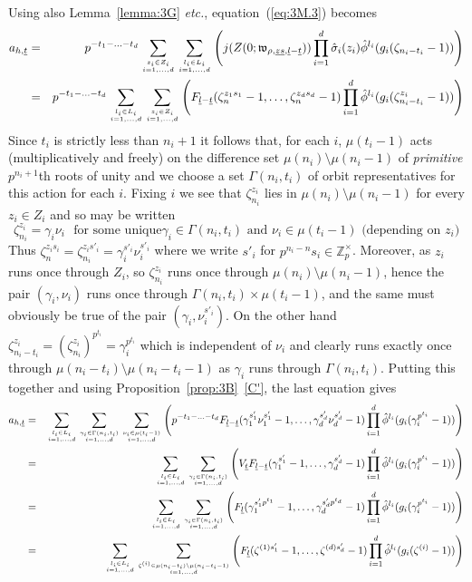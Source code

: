\documentclass[12pt]{article}
\newcounter{rem}[section]%
\newcommand{\bbZ}{\ensuremath{\mathbb{Z}}}
\newcommand{\etc}{\emph{etc.}}
\newcommand{\fw}{\ensuremath{\mathfrak{w}}}
\newcommand{\refeq}[1]{~(\ref{eq:#1})}
\newcommand{\rem}{\refstepcounter{rem}\noindent{\sc Remark \therem}}%
\renewcommand{\therem}{\thesection.\arabic{rem}}
\newcommand{\ul}{\ensuremath{{\underline{l}}}}
\newcommand{\us}{\ensuremath{{\underline{s}}}}
\newcommand{\ut}{\ensuremath{{\underline{t}}}}
\newcommand{\uz}{\ensuremath{{\underline{z}}}}
\begin{document}
Using also Lemma~\ref{lemma:3G} \etc, equation\refeq{3M.3} becomes
\begin{eqnarray*}
a_{h,\underline{t}}&=& p^{-t_1-\ldots-t_d}
\sum_{z_i\in Z_i\atop i=1,\ldots,d}
\sum_{l_i\in L_i\atop i=1,\ldots,d}
\left(
j(Z(0;\fw_{\rho,\uz\us,\ul-\ut}))\prod_{i=1}^d
\hat{\sigma}_i(z_i)\hat{\phi}^{l_i}
(g_i(\zeta_{n_i-t_i}-1))
\right)\\
&=& p^{-t_1-\ldots-t_d}
\sum_{l_i\in L_i\atop i=1,\ldots,d}
\sum_{z_i\in Z_i\atop i=1,\ldots,d}
\left(
F_{\ul-\ut}(\zeta_n^{z_1s_1}-1,\ldots,\zeta_n^{z_ds_d}-1)
\prod_{i=1}^d
\hat{\phi}^{l_i}
(g_i(\zeta_{n_i-t_i}^{z_i}-1))
\right)
\end{eqnarray*}
Since $t_i$ is strictly less than $n_i+1$ it follows that, for each $i$,
$\mu(t_i-1)$ acts (multiplicatively and freely) on the difference set
$\mu(n_i)\setminus\mu(n_i-1)$ of
\emph{primitive} $p^{n_i+1}$th roots of unity
and we choose a set $\Gamma(n_i,t_i)$ of orbit representatives
for this action for each $i$. Fixing $i$ we see that
$\zeta_{n_i}^{z_i}$ lies in $\mu(n_i)\setminus\mu(n_i-1)$
for every $z_i\in Z_i$ and so may be written
\[
\zeta_{n_i}^{z_i}=\gamma_i\nu_i\ \ \ \mbox{for some unique
$\gamma_i\in \Gamma(n_i,t_i)$ and $\nu_i\in\mu(t_i-1)$ (depending on $z_i$)}
\]
Thus $\zeta_n^{z_is_i}=\zeta_{n_i}^{z_is'_i}=
\gamma_i^{s'_i}\nu_i^{s'_i}$ where we write $s'_i$ for
$p^{n_i-n}s_i\in\bbZ_p^\times$.
Moreover, as $z_i$ runs once through $Z_i$, so
$\zeta_{n_i}^{z_i}$ runs once through  $\mu(n_i)\setminus\mu(n_i-1)$,
hence the pair
$(\gamma_i,\nu_i)$ runs once through $\Gamma(n_i,t_i)\times \mu(t_i-1)$,
and the same must obviously be true of the pair $(\gamma_i,\nu_i^{s'_i})$.
On the other hand $\zeta_{n_i-t_i}^{z_i}=
(\zeta_{n_i}^{z_i})^{p^{t_i}}=\gamma_i^{p^{t_i}}$
which is independent of $\nu_i$ and clearly runs exactly once through
$\mu(n_i-t_i)\setminus\mu(n_i-t_i-1)$
as $\gamma_i$ runs
through $\Gamma(n_i,t_i)$. Putting this together
and using Proposition~\ref{prop:3B}~\ref{C'},
the last equation gives
\begin{eqnarray*}
a_{h,\underline{t}}&=&\sum_{l_i\in L_i\atop i=1,\ldots,d}
\sum_{\gamma_i\in \Gamma(n_i,t_i)\atop i=1,\ldots,d}
\sum_{\nu_i\in\mu(t_i-1)\atop i=1,\ldots,d}
\left(
p^{-t_1-\ldots-t_d}
F_{\ul-\ut}(\gamma_1^{s'_1}\nu_1^{s'_1}-1,\ldots,
\gamma_d^{s'_d}\nu_d^{s'_d}-1)
\prod_{i=1}^d\hat{\phi}^{l_i}(g_i(\gamma_i^{p^{t_i}}-1))
\right)
\\
                   &=&
\sum_{l_i\in L_i\atop i=1,\ldots,d}
\sum_{\gamma_i\in \Gamma(n_i,t_i)\atop i=1,\ldots,d}
\left(
V_\ut
F_{\ul-\ut}(\gamma_1^{s'_1}-1,\ldots,
\gamma_d^{s'_d}-1)
\prod_{i=1}^d\hat{\phi}^{l_i}(g_i(\gamma_i^{p^{t_i}}-1))
\right)
\\
                   &=&
\sum_{l_i\in L_i\atop i=1,\ldots,d}
\sum_{\gamma_i\in \Gamma(n_i,t_i)\atop i=1,\ldots,d}
\left(
F_{\ul}(\gamma_1^{s'_1p^{t_1}}-1,\ldots,
\gamma_d^{s'_dp^{t_d}}-1)
\prod_{i=1}^d\hat{\phi}^{l_i}(g_i(\gamma_i^{p^{t_i}}-1))
\right)
\\
                   &=&
\sum_{l_i\in L_i\atop i=1,\ldots,d}
\sum_{\zeta^{(i)}\in\mu(n_i-t_i)\setminus\mu(n_i-t_i-1)\atop i=1,\ldots,d}
\left(
F_{\ul}( \zeta^{(1)s'_1}-1,\ldots,
\zeta^{(d)s'_d}-1)
\prod_{i=1}^d\hat{\phi}^{l_i}(g_i(\zeta^{(i)}-1))
\right)
\end{eqnarray*}
\end{document}
